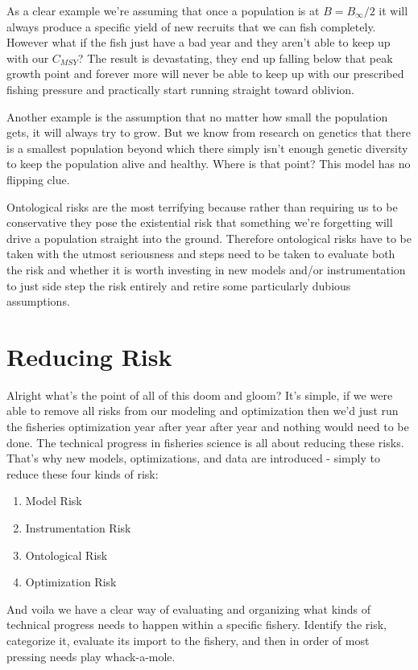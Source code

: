 \documentclass[11pt,a5paper]{book}
\begin{document}
As a clear example we're assuming that once a population is at $B=B_\infty / 2$ it will always produce a specific yield of new recruits that we can fish completely. However what if the fish just have a bad year and they aren't able to keep up with our $C_{MSY}$? The result is devastating, they end up falling below that peak growth point and forever more will never be able to keep up with our prescribed fishing pressure and practically start running straight toward oblivion. 
\newline

Another example is the assumption that no matter how small the population gets, it will always try to grow. But we know from research on genetics that there is a smallest population beyond which there simply isn't enough genetic diversity to keep the population alive and healthy. Where is that point? This model has no flipping clue. 
\newline

Ontological risks are the most terrifying because rather than requiring us to be conservative they pose the existential risk that something we're forgetting will drive a population straight into the ground. Therefore ontological risks have to be taken with the utmost seriousness and steps need to be taken to evaluate both the risk and whether it is worth investing in new models and/or instrumentation to just side step the risk entirely and retire some particularly dubious assumptions. 

\section{Reducing Risk}
Alright what's the point of all of this doom and gloom? It's simple, if we were able to remove all risks from our modeling and optimization then we'd just run the fisheries optimization year after year after year and nothing would need to be done. The technical progress in fisheries science is all about reducing these risks. That's why new models, optimizations, and data are introduced - simply to reduce these four kinds of risk:

\begin{enumerate}
\item Model Risk
\item Instrumentation Risk
\item Ontological Risk
\item Optimization Risk
\end{enumerate}

And voila we have a clear way of evaluating and organizing what kinds of technical progress needs to happen within a specific fishery. Identify the risk, categorize it, evaluate its import to the fishery, and then in order of most pressing needs play whack-a-mole. 
\newpage
\end{document}
